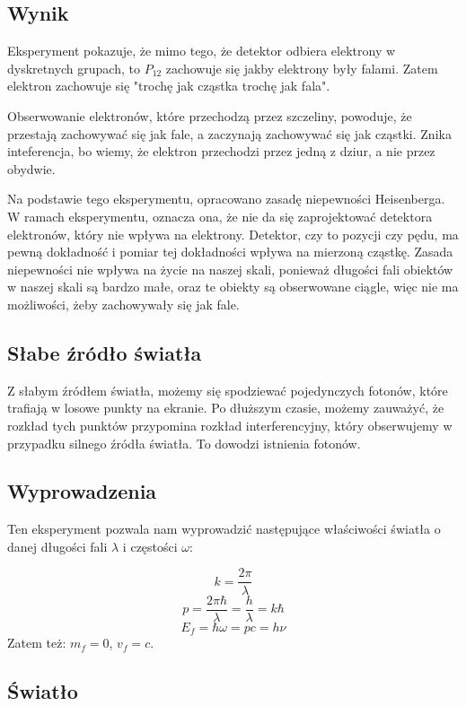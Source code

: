 \documentclass{../notatki}
\begin{document}
\subsection{Wynik}

Eksperyment pokazuje, że mimo tego, że detektor odbiera elektrony
w dyskretnych grupach, to $P_{12}$ zachowuje się jakby elektrony były falami.
Zatem elektron zachowuje się "trochę jak cząstka trochę jak fala".

Obserwowanie elektronów, które przechodzą przez szczeliny, powoduje,
że przestają zachowywać się jak fale, a zaczynają zachowywać się jak cząstki.
Znika inteferencja, bo wiemy, że elektron przechodzi przez jedną z
dziur, a nie przez obydwie.

Na podstawie tego eksperymentu, opracowano zasadę niepewności Heisenberga.
W ramach eksperymentu, oznacza ona, że nie da się zaprojektować detektora
elektronów, który nie wpływa na elektrony. Detektor, czy to pozycji czy pędu,
ma pewną dokładność i pomiar tej dokładności wpływa na mierzoną cząstkę.
Zasada niepewności nie wpływa na życie na naszej skali, ponieważ długości fali
obiektów w naszej skali są bardzo małe, oraz te obiekty są obserwowane ciągle,
więc nie ma możliwości, żeby zachowywały się jak fale.

\subsection{Słabe źródło światła}

Z słabym źródłem światła, możemy się spodziewać pojedynczych fotonów, które
trafiają w losowe punkty na ekranie. Po dłuższym czasie, możemy
zauważyć, że rozkład tych punktów przypomina rozkład interferencyjny,
który obserwujemy w przypadku silnego źródła światła.
To dowodzi istnienia fotonów.

\subsection{Wyprowadzenia}

Ten eksperyment pozwala nam wyprowadzić następujące właściwości
światła o danej długości fali $\lambda$ i częstości $\omega$:

$$
k = \frac{2 \pi}{\lambda}
$$
$$
p = \frac{2\pi\hbar}{\lambda} = \frac{h}{\lambda} = k\hbar
$$
$$
E_f = \hbar \omega = pc = h \nu
$$
Zatem też: $m_f = 0$, $v_f = c$.

\subsection{Światło}
\end{document}
